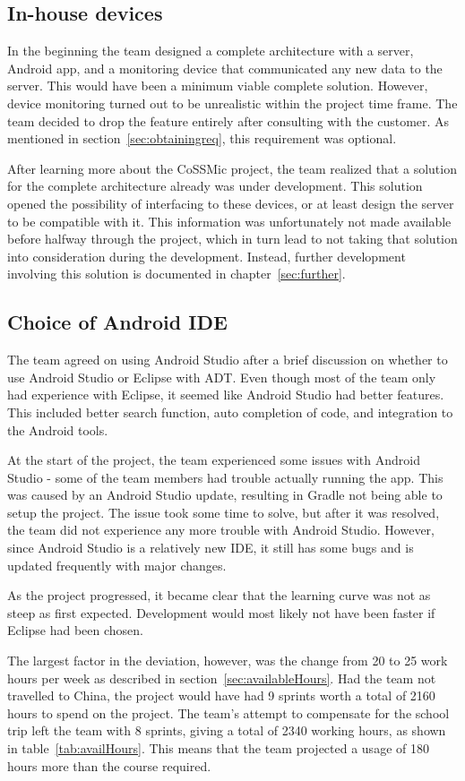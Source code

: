 \subsection{In-house devices}
In the beginning the team designed a complete architecture with a server, Android app, and a monitoring device that communicated any new data to the server. This would have been a minimum viable complete solution. However, device monitoring turned out to be unrealistic within the project time frame. The team decided to drop the feature entirely after consulting with the customer. As mentioned in section~\ref{sec:obtainingreq}, this requirement was optional.

After learning more about the CoSSMic project, the team realized that a solution for the complete architecture already was under development. This solution opened the possibility of interfacing to these devices, or at least design the server to be compatible with it. This information was unfortunately not made available before halfway through the project, which in turn lead to not taking that solution into consideration during the development. Instead, further development involving this solution is documented in chapter~\ref{sec:further}.

\subsection{Choice of Android IDE}
The team agreed on using Android Studio after a brief discussion on whether to use Android Studio or Eclipse with ADT. Even though most of the team only had experience with Eclipse, it seemed like Android Studio had better features. This included better search function, auto completion of code, and integration to the Android tools.
 
At the start of the project, the team experienced some issues with Android Studio - some of the team members had trouble actually running the app. This was caused by an Android Studio update, resulting in Gradle not being able to setup the project. The issue took some time to solve, but after it was resolved, the team did not experience any more trouble with Android Studio. However, since Android Studio is a relatively new IDE, it still has some bugs and is updated frequently with major changes.

As the project progressed, it became clear that the learning curve was not as steep as first expected. Development would most likely not have been faster if Eclipse had been chosen.



The largest factor in the deviation, however, was the change from 20 to 25 work hours per week as described in section~\ref{sec:availableHours}. Had the team not travelled to China, the project would have had 9 sprints worth a total of 2160 hours to spend on the project. The team's attempt to compensate for the school trip left the team with 8 sprints, giving a total of 2340 working hours, as shown in table~\ref{tab:availHours}. This means that the team projected a usage of 180 hours more than the course required.

